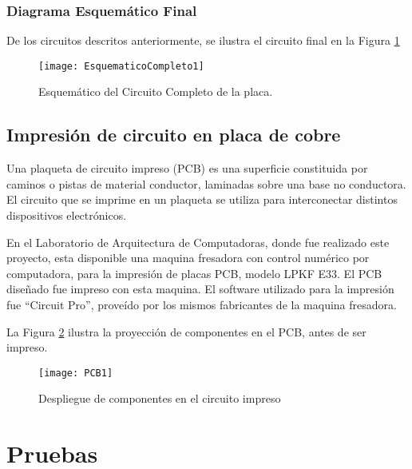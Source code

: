 \subsubsection{Diagrama Esquemático Final}
\label{it3:ssub:diagrama_esquematico_final}

De los circuitos descritos anteriormente, se ilustra el circuito final en la Figura \ref{fig:EsquematicoCompleto1}

\begin{figure}[H]
\centering
  \texttt{[image: EsquematicoCompleto1]}
  \caption{Esquemático del Circuito Completo de la placa.}\label{fig:EsquematicoCompleto1}
\end{figure}



\subsection{Impresión de circuito en placa de cobre}
\label{it3:sub:impresion_de_circuito_en_placa_de_cobre}

Una plaqueta de circuito impreso (PCB) es una superficie constituida por caminos o pistas de material conductor, laminadas sobre una base no conductora. El circuito que se imprime en un plaqueta se utiliza para interconectar distintos dispositivos electrónicos.

En el Laboratorio de Arquitectura de Computadoras, donde fue realizado este proyecto, esta disponible una maquina fresadora con control numérico por computadora, para la impresión de placas PCB, modelo LPKF E33. El PCB diseñado fue impreso con esta maquina. El software utilizado para la impresión fue ``Circuit Pro'', proveído por los mismos fabricantes de la maquina fresadora. 

La Figura \ref{fig:PCB1} ilustra la proyección de componentes en el PCB, antes de ser impreso.

\begin{figure}
\centering
  \texttt{[image: PCB1]}
  \caption{Despliegue de componentes en el circuito impreso}\label{fig:PCB1}
\end{figure}




\clearpage


\section{Pruebas} %
\label{it3:sec:pruebas}


